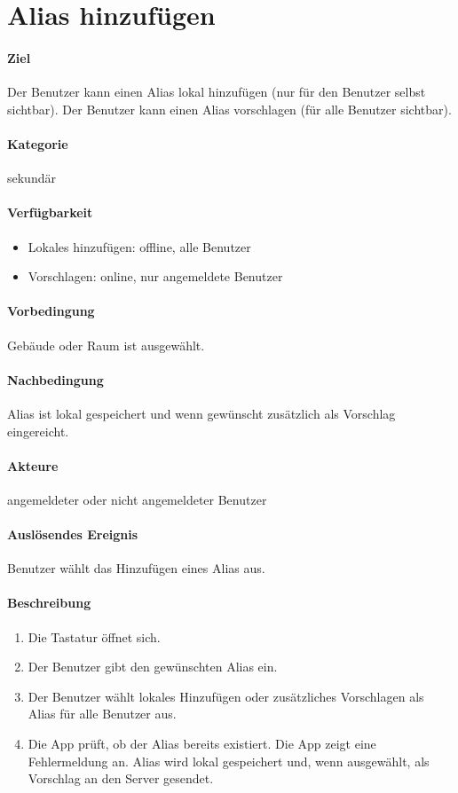 \section{Alias hinzufügen}
\paragraph{Ziel}
Der Benutzer kann einen Alias lokal hinzufügen (nur für den Benutzer selbst sichtbar). Der Benutzer kann einen Alias vorschlagen (für alle Benutzer sichtbar).
\paragraph{Kategorie}
sekundär
\paragraph{Verfügbarkeit}
\begin{itemize}
    \item Lokales hinzufügen: offline, alle Benutzer
    \item Vorschlagen: online, nur angemeldete Benutzer
\end{itemize}

\paragraph{Vorbedingung}
Gebäude oder Raum ist ausgewählt.
\paragraph{Nachbedingung}
Alias ist lokal gespeichert und wenn gewünscht zusätzlich als Vorschlag eingereicht.
\paragraph{Akteure}
angemeldeter oder nicht angemeldeter Benutzer
\paragraph{Auslösendes Ereignis}
Benutzer wählt das Hinzufügen eines Alias aus.
\paragraph{Beschreibung}
\begin{enumerate}
    \item Die Tastatur öffnet sich.
    \item Der Benutzer gibt den gewünschten Alias ein.
    \item Der Benutzer wählt lokales Hinzufügen oder zusätzliches Vorschlagen als Alias für alle Benutzer aus.
    \item Die App prüft, ob der Alias bereits existiert.
     Die App zeigt eine Fehlermeldung an.
     Alias wird lokal gespeichert und, wenn ausgewählt, als Vorschlag an den Server gesendet.
\end{enumerate}
